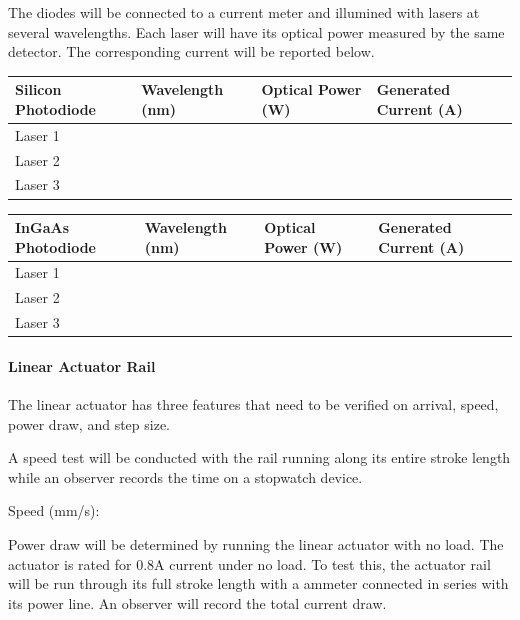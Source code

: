 The diodes will be connected to a current meter and illumined with lasers at several wavelengths. Each laser will have its optical power measured by the same detector. The corresponding current will be reported below.

\begin{table}[H]
	\centering
	\label{table:VIS Diode Response}
	\bigskip
	\begin{tabular}{|p{3cm}|p{2.5cm}|p{2cm}|p{2.75cm}|}
	\hline
	Silicon Photodiode & Wavelength (nm) & Optical Power (W) & Generated Current (A)\\
	\hline
	Laser 1 & & & \\
	\hline
	Laser 2 & & & \\
	\hline
	Laser 3 & & & \\
	\hline
	\end{tabular}
\end{table}

\begin{table}[H]
	\centering
	\label{table:NIR Diode Response}
	\bigskip
	\begin{tabular}{|p{3cm}|p{2.5cm}|p{2cm}|p{2.75cm}|}
	\hline
	InGaAs Photodiode & Wavelength (nm) & Optical Power (W) & Generated Current (A)\\
	\hline
	Laser 1 & & & \\
	\hline
	Laser 2 & & & \\
	\hline
	Laser 3 & & & \\
	\hline
	\end{tabular}
\end{table}

\paragraph{Linear Actuator Rail} The linear actuator has three features that need to be verified on arrival, speed, power draw, and step size. 
\bigskip

A speed test will be conducted with the rail running along its entire stroke length while an observer records the time on a stopwatch device.
\bigskip

Speed (mm/s):
\bigskip

Power draw will be determined by running the linear actuator with no load. The actuator is rated for 0.8A current under no load. To test this, the actuator rail will be run through its full stroke length with a ammeter connected in series with its power line. An observer will record the total current draw.
\bigskip

